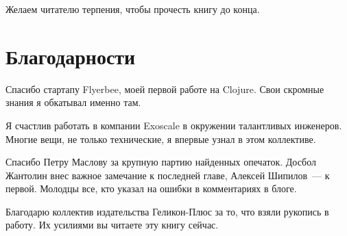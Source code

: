 Желаем читателю терпения, чтобы прочесть книгу до конца.

\section*{Благодарности}

Спасибо стартапу Flyerbee, моей первой работе на Clojure. Свои скромные знания я
обкатывал именно там.

Я счастлив работать в компании Exoscale в окружении талантливых
инженеров. Многие вещи, не только технические, я впервые узнал в этом
коллективе.

Спасибо Петру Маслову за крупную партию найденных опечаток. Досбол Жантолин внес
важное замечание к последней главе, Алексей Шипилов~--- к первой. Молодцы все,
кто указал на ошибки в комментариях в блоге.

Благодарю коллектив издательства Геликон-Плюс за то, что взяли рукопись в
работу. Их усилиями вы читаете эту книгу сейчас.
